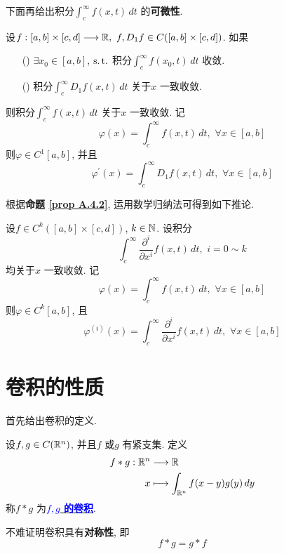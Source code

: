 	下面再给出积分$\int_{c}^{\infty} f(x , t) \, dt$ 的\textbf{可微性}.
	
	\begin{proposition}\label{prop A.4.2}
		设$f : [a , b] \times [c , d] \longrightarrow \mathbb{R} , \,\, f , D_{1}f \in C([a , b] \times [c  ,d])$. 如果
		\begin{center}
			\begin{enumerate}
				\item[(\rmnum{1})] $\exists x_0 \in [a , b]$, $\operatorname{s.t.}$ 积分$\int_{c}^{\infty} f(x_0 , t) \, dt$ 收敛.
				
				\item[(\rmnum{2})] 积分$\int_{c}^{\infty} D_{1}f(x , t) \, dt$ 关于$x$ 一致收敛.
			\end{enumerate}
		\end{center}
		则积分$\int_{c}^{\infty} f(x , t) \, dt$ 关于$x$ 一致收敛. 记
		\[ \varphi(x) = \int_{c}^{\infty} f(x , t) \, dt , \,\, \forall x \in [a , b] \]
		则$\varphi \in C^{1}[a , b]$, 并且
		\[ \varphi^{'}(x) = \int_{c}^{\infty} D_{1}f(x , t) \, dt , \,\, \forall x \in [a , b] \]
	\end{proposition}

	\newpage
	
	根据\textbf{命题 \ref{prop A.4.2}}, 运用数学归纳法可得到如下推论.
	
	\begin{corollary}\label{cor A.4.1}
		设$f \in C^{k}([a , b] \times [c , d])$, $k \in \mathbb{N}$. 设积分
		\[ \int_{c}^{\infty} \frac{\partial^i}{\partial x^i} f(x , t) \, dt , \,\, i = 0 \sim k \]
		均关于$x$ 一致收敛. 记
		\[ \varphi(x) = \int_{c}^{\infty} f(x , t) \, dt , \,\, \forall x \in [a , b] \]
		则$\varphi \in C^{k}[a , b]$, 且
		\[ \varphi^{(i)}(x) = \int_{c}^{\infty} \frac{\partial^i}{\partial x^i} f(x , t) \, dt , \,\, \forall x \in [a , b] \]
	\end{corollary}

\newpage

\section{卷积的性质}
	首先给出卷积的定义.
	\begin{defn}\label{def A.5.1}
		设$f , g \in C(\mathbb{R}^n)$, 并且$f$ 或$g$ 有紧支集. 定义
		\begin{align}
			f * g : \mathbb{R}^n &\longrightarrow \mathbb{R} \\
			x &\longmapsto \int_{\mathbb{R}^n} f(x - y) g(y) \, dy
		\end{align}
		称$f*g$ 为\underline{\textcolor{blue}{\textbf{$f , g$ 的卷积}}}. 
		
		\begin{rmk}
			不难证明卷积具有\textbf{对称性}, 即
			\[ f*g = g*f \]
		\end{rmk}
	\end{defn}

